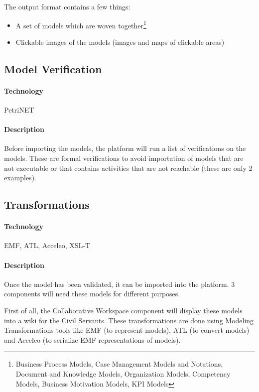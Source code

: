 \documentclass{learnpad}
\begin{document}
The output format contains a few things:
\begin{itemize}
	\item A set of models which are woven together\footnote{Business Process
		Models, Case Management Models and Notations, Document and Knowledge
		Models, Organization Models, Competency Models, Business Motivation
		Models, KPI Models}
	\item Clickable images of the models (images and maps of clickable areas)
\end{itemize}

\subsection{Model Verification}
\label{sec:model-verification}

\paragraph{Technology}
PetriNET

\paragraph{Description}
Before importing the models, the \learnpad platform will run a list of
verifications on the models.  These are formal verifications to avoid
importation of models that are not executable or that contains activities that
are not reachable (these are only 2 examples).

\subsection{Transformations}
\label{sec:transformations}

\paragraph{Technology}
EMF, ATL, Acceleo, XSL-T

\paragraph{Description}
Once the model has been validated, it can be imported into the \learnpad
platform.  3 components will need these models for different purposes.

First of all, the Collaborative Workspace component will display these models
into a wiki for the Civil Servants.  These transformations are done using
Modeling Transformations tools like EMF (to represent models), ATL (to convert
models) and Acceleo (to serialize EMF representations of models).
\end{document}

